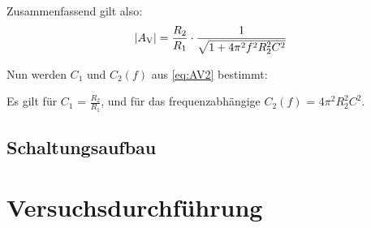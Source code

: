 Zusammenfassend gilt also:
\begin{equation}
    |A\textsubscript{V}| = \frac{R_2}{R_1} \cdot \frac{1}{\sqrt{1 + 4 \pi^2 f^2 R_2 ^ 2 C^2}}
    \label{eq:AV3}
\end{equation}

Nun werden $C_1$ und $C_2(f)$ aus \ref{eq:AV2} bestimmt: \par
Es gilt für $C_1$ = $\frac{R_2}{R_1}$,
 und für das frequenzabhängige $C_2(f)$ = $4 \pi^2 R_2 ^ 2 C^2$.


\subsection{Schaltungsaufbau}

\section{Versuchsdurchführung}